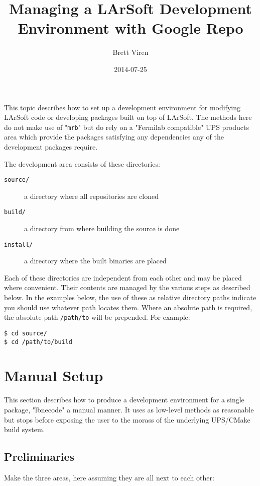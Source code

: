 \documentclass[11pt]{article}
\author{Brett Viren}
\date{2014-07-25}
\title{Managing a LArSoft Development Environment with Google Repo}
\begin{document}
\maketitle
\tableofcontents

This topic describes how to set up a development environment for modifying LArSoft code or developing packages built on top of LArSoft.  The methods here do not make use of "\texttt{mrb}" but do rely on a "Fermilab compatible" UPS products area which provide the packages satisfying any dependencies any of the development packages require.

The development area consists of these directories:

\begin{description}
\item[{\texttt{source/}}] a directory where all repositories are cloned
\item[{\texttt{build/}}] a directory from where building the source is done
\item[{\texttt{install/}}] a directory where the built binaries are placed
\end{description}

Each of these directories are independent from each other and may be placed where convenient.   Their contents are managed by the various steps as described below.  In the examples below, the use of these as relative directory paths indicate you should use whatever path locates them.  Where an absolute path is required, the absolute path \texttt{/path/to} will be prepended.  For example:

\begin{verbatim}
$ cd source/
$ cd /path/to/build
\end{verbatim}

\section{Manual Setup}
\label{sec-1}

This section describes how to produce a development environment for a single package, "lbnecode"  a manual manner.  It uses as low-level methods as reasonable but stops before exposing the user to the morass of the underlying UPS/CMake build system.

\subsection{Preliminaries}
\label{sec-1-1}

Make the three areas, here assuming they are all next to each other:
\end{document}
